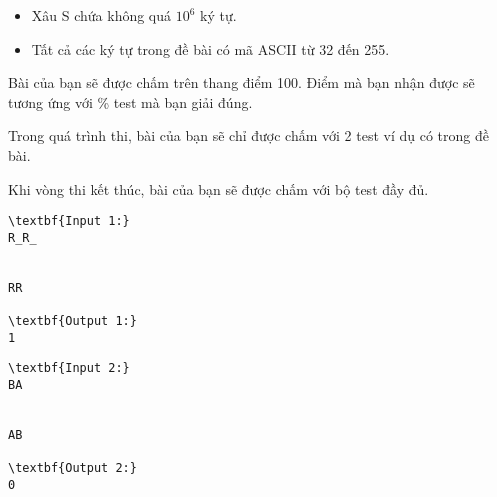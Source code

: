 \begin{itemize}
	\item     Xâu S chứa không quá $10^{6}$    ký tự.   
	\item     Tất cả các ký tự trong đề bài có mã ASCII từ 32 đến 255.   
\end{itemize}
Bài của bạn sẽ được chấm trên thang điểm 100. Điểm mà bạn nhận được sẽ tương ứng với \% test mà bạn giải đúng.  

   Trong quá trình thi, bài của bạn sẽ chỉ được chấm với 2 test ví dụ có trong đề bài.  

   Khi vòng thi kết thúc, bài của bạn sẽ được chấm với bộ test đầy đủ.
\begin{verbatim}
\textbf{Input 1:}
R_R_


RR

\textbf{Output 1:}
1
\end{verbatim}
\begin{verbatim}
\textbf{Input 2:}
BA


AB

\textbf{Output 2:}
0\end{verbatim}
